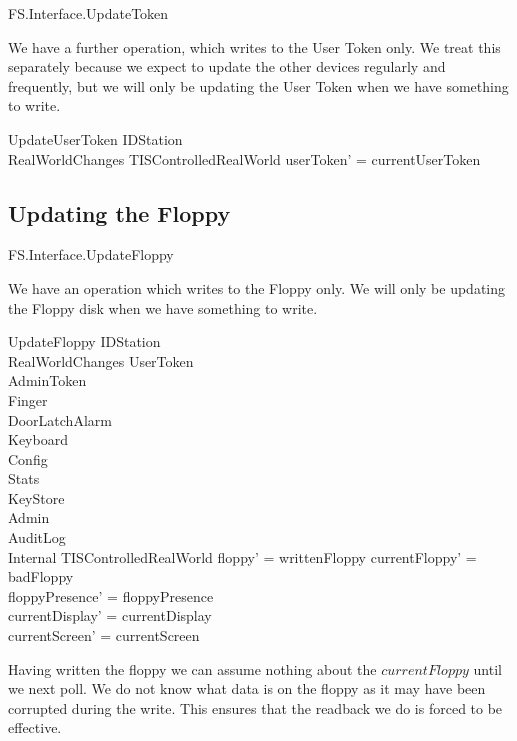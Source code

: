 \begin{traceunit}{FS.Interface.UpdateToken}
\end{traceunit}

We have a further operation, which writes to the User Token only.
We treat this separately because we expect to update the other devices
regularly and frequently,
but we will only be updating the User Token when we have something to
write. 

\begin{schema}{UpdateUserToken}
	\Xi IDStation
\\	RealWorldChanges
\also
        \Xi TISControlledRealWorld
\where
	userToken' = currentUserToken
\end{schema}

\subsection{Updating the Floppy}

\begin{traceunit}{FS.Interface.UpdateFloppy}
\end{traceunit}


We have an operation which writes to the Floppy only.
We will only be updating the Floppy disk when we have something to write.

\begin{schema}{UpdateFloppy}
        \Delta IDStation
\\      RealWorldChanges
\also
        \Xi UserToken
\\      \Xi AdminToken
\\      \Xi Finger
\\      \Xi DoorLatchAlarm
\\      \Xi Keyboard
\\      \Xi Config
\\      \Xi Stats
\\      \Xi KeyStore
\\      \Xi Admin      
\\      \Xi AuditLog
\\      \Xi Internal
\also
	\Xi TISControlledRealWorld
\where
	floppy' = writtenFloppy
\also
        currentFloppy' = badFloppy
\\      floppyPresence' = floppyPresence
\\      currentDisplay' = currentDisplay
\\      currentScreen' = currentScreen
\end{schema}
\begin{Zcomment}
\item
Having written the floppy we can assume nothing about the $currentFloppy$
until we next poll. We do not know what data is on the floppy as it
may have been corrupted during the write. This ensures that the
readback we do is forced to be effective. 
\end{Zcomment}
